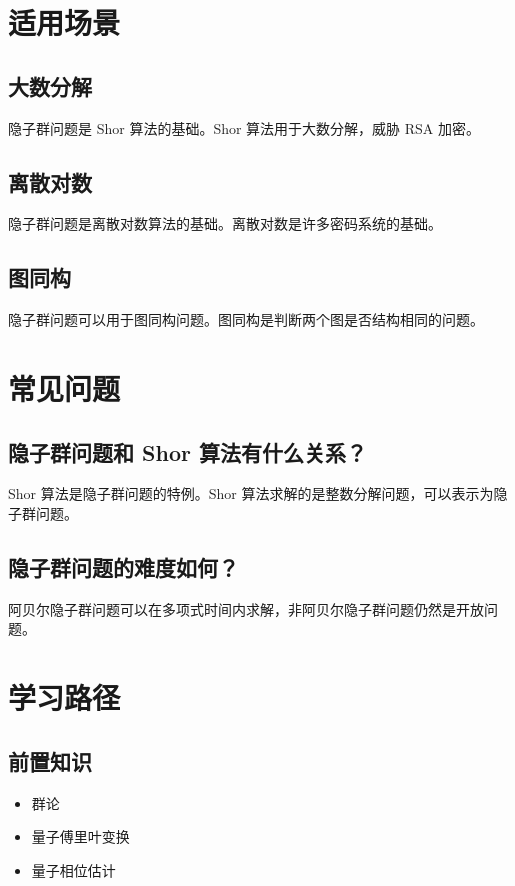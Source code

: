 \documentclass[12pt,a4paper]{article}
\begin{document}
\section{适用场景}

\subsection{大数分解}

隐子群问题是 Shor 算法的基础。Shor 算法用于大数分解，威胁 RSA 加密。

\subsection{离散对数}

隐子群问题是离散对数算法的基础。离散对数是许多密码系统的基础。

\subsection{图同构}

隐子群问题可以用于图同构问题。图同构是判断两个图是否结构相同的问题。

\section{常见问题}

\subsection{隐子群问题和 Shor 算法有什么关系？}

Shor 算法是隐子群问题的特例。Shor 算法求解的是整数分解问题，可以表示为隐子群问题。

\subsection{隐子群问题的难度如何？}

阿贝尔隐子群问题可以在多项式时间内求解，非阿贝尔隐子群问题仍然是开放问题。

\section{学习路径}

\subsection{前置知识}
\begin{itemize}
  \item 群论
  \item 量子傅里叶变换
  \item 量子相位估计
\end{itemize}
\end{document}

